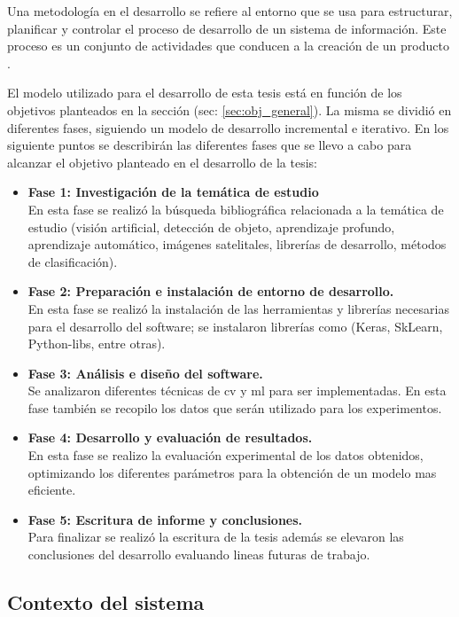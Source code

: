 Una metodología en el desarrollo se refiere al entorno que se usa para estructurar, planificar y controlar el proceso de desarrollo de un sistema de información. Este proceso es un conjunto de actividades que conducen a la creación de un producto \citep{sommerville}.


El modelo utilizado para el desarrollo de esta tesis está en función de los objetivos planteados en la sección (sec: \ref{sec:obj_general}). La misma se dividió en diferentes fases, siguiendo un modelo de desarrollo incremental e iterativo. En los siguiente puntos se describirán las diferentes fases que se llevo a cabo para alcanzar el objetivo planteado en el desarrollo de la tesis:
\begin{itemize}
	\item \textbf{Fase 1: Investigación de la temática de estudio}\\
	En esta fase se realizó la búsqueda bibliográfica relacionada a la temática de estudio (visión artificial, detección de objeto, 
	aprendizaje profundo, aprendizaje automático, imágenes satelitales, librerías de desarrollo, métodos de clasificación).
	\item \textbf{Fase 2: Preparación e instalación de entorno de desarrollo.}\\
	En esta fase se realizó la instalación de las herramientas y librerías necesarias para el desarrollo del software; se instalaron librerías  
como (Keras, SkLearn, Python-libs, entre otras).
	\item \textbf{Fase 3: Análisis e diseño del software.}\\
	Se analizaron diferentes técnicas de \ac{cv} y \ac{ml} para ser implementadas. En esta fase también se recopilo los datos que serán utilizado para los experimentos.
	\item \textbf{Fase 4: Desarrollo y evaluación de resultados.}\\
	En esta fase se realizo la evaluación experimental de los datos obtenidos, optimizando los diferentes parámetros para la obtención de un 
modelo mas eficiente.
	\item \textbf{Fase 5: Escritura de informe y conclusiones.}\\
	Para finalizar se realizó la escritura de la tesis además se elevaron las conclusiones del desarrollo evaluando lineas futuras de trabajo.
\end{itemize}


\subsection{Contexto del sistema}\label{sub:casodeuso}


